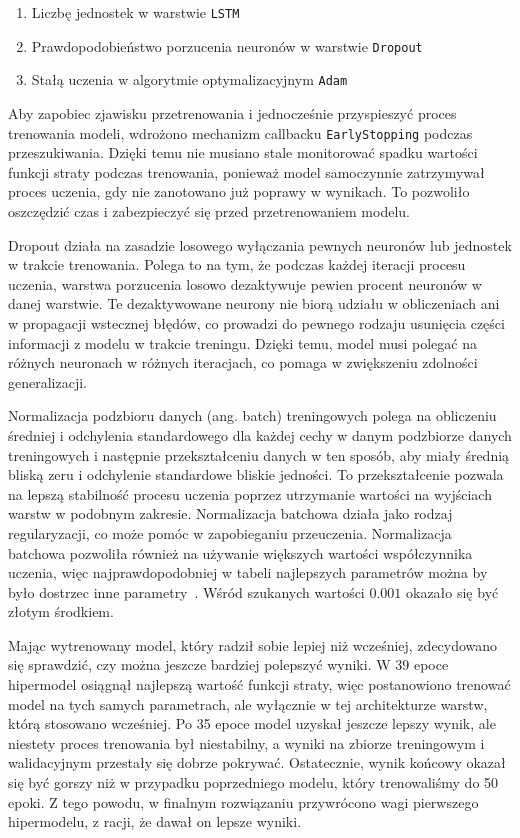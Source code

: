 \begin{enumerate}
    \item Liczbę jednostek w warstwie \texttt{LSTM}
    \item Prawdopodobieństwo porzucenia neuronów w warstwie \texttt{Dropout}
    \item Stałą uczenia w algorytmie optymalizacyjnym \texttt{Adam}
\end{enumerate}

Aby zapobiec zjawisku przetrenowania i jednocześnie przyspieszyć proces trenowania modeli, wdrożono mechanizm callbacku \texttt{EarlyStopping} podczas przeszukiwania. Dzięki temu nie musiano stale monitorować spadku wartości funkcji straty podczas trenowania, ponieważ model samoczynnie zatrzymywał proces uczenia, gdy nie zanotowano już poprawy w wynikach. To pozwoliło oszczędzić czas i zabezpieczyć się przed przetrenowaniem modelu.

Dropout działa na zasadzie losowego wyłączania pewnych neuronów lub jednostek w trakcie trenowania. Polega to na tym, że podczas każdej iteracji procesu uczenia, warstwa porzucenia losowo dezaktywuje pewien procent neuronów w danej warstwie. Te dezaktywowane neurony nie biorą udziału w obliczeniach ani w propagacji wstecznej błędów, co prowadzi do pewnego rodzaju usunięcia części informacji z modelu w trakcie treningu. Dzięki temu, model musi polegać na różnych neuronach w różnych iteracjach, co pomaga w zwiększeniu zdolności generalizacji.

Normalizacja podzbioru danych (ang. batch) treningowych polega na obliczeniu średniej i odchylenia standardowego dla każdej cechy w danym podzbiorze danych treningowych i następnie przekształceniu danych w ten sposób, aby miały średnią bliską zeru i odchylenie standardowe bliskie jedności. To przekształcenie pozwala na lepszą stabilność procesu uczenia poprzez utrzymanie wartości na wyjściach warstw w podobnym zakresie. Normalizacja batchowa działa jako rodzaj regularyzacji, co może pomóc w zapobieganiu przeuczenia. Normalizacja batchowa pozwoliła również na używanie większych wartości współczynnika uczenia, więc najprawdopodobniej w tabeli najlepszych parametrów można by było dostrzec inne parametry~\cite{ioffe2015}. Wśród szukanych wartości $0.001$ okazało się być złotym środkiem.

Mając wytrenowany model, który radził sobie lepiej niż wcześniej, zdecydowano się sprawdzić, czy można jeszcze bardziej polepszyć wyniki. W 39 epoce hipermodel osiągnął najlepszą wartość funkcji straty, więc postanowiono trenować model na tych samych parametrach, ale wyłącznie w tej architekturze warstw, którą stosowano wcześniej. Po 35 epoce model uzyskał jeszcze lepszy wynik, ale niestety proces trenowania był niestabilny, a wyniki na zbiorze treningowym i walidacyjnym przestały się dobrze pokrywać. Ostatecznie, wynik końcowy okazał się być gorszy niż w przypadku poprzedniego modelu, który trenowaliśmy do 50 epoki. Z tego powodu, w finalnym rozwiązaniu przywrócono wagi pierwszego hipermodelu, z racji, że dawał on lepsze wyniki.

